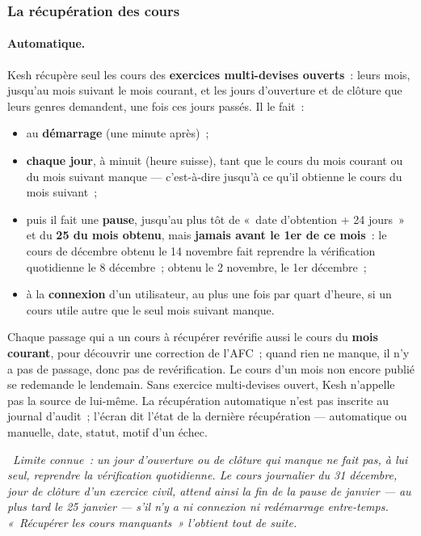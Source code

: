 \documentclass[a4paper,11pt,oneside]{article}
\begin{document}
\subsubsection{La récupération des cours}\label{sec:cours-recuperation}

\paragraph{Automatique.} Kesh récupère seul les cours des \textbf{exercices multi-devises ouverts}~: leurs mois, jusqu'au mois suivant le mois courant, et les jours d'ouverture et de clôture que leurs genres demandent, une fois ces jours passés. Il le fait~:
\begin{itemize}
    \item au \textbf{démarrage} (une minute après)~;
    \item \textbf{chaque jour}, à minuit (heure suisse), tant que le cours du mois courant ou du mois suivant manque --- c'est-à-dire jusqu'à ce qu'il obtienne le cours du mois suivant~;
    \item puis il fait une \textbf{pause}, jusqu'au plus tôt de «~date d'obtention + 24 jours~» et du \textbf{25 du mois obtenu}, mais \textbf{jamais avant le 1er de ce mois}~: le cours de décembre obtenu le 14 novembre fait reprendre la vérification quotidienne le 8 décembre~; obtenu le 2 novembre, le 1er décembre~;
    \item à la \textbf{connexion} d'un utilisateur, au plus une fois par quart d'heure, si un cours utile autre que le seul mois suivant manque.
\end{itemize}
Chaque passage qui a un cours à récupérer revérifie aussi le cours du \textbf{mois courant}, pour découvrir une correction de l'AFC~; quand rien ne manque, il n'y a pas de passage, donc pas de revérification. Le cours d'un mois non encore publié se redemande le lendemain. Sans exercice multi-devises ouvert, Kesh n'appelle pas la source de lui-même. La récupération automatique n'est pas inscrite au journal d'audit~; l'écran dit l'état de la dernière récupération --- automatique ou manuelle, date, statut, motif d'un échec.

\keshAttention\ \emph{Limite connue~: un jour d'ouverture ou de clôture qui manque ne fait pas, à lui seul, reprendre la vérification quotidienne. Le cours journalier du 31 décembre, jour de clôture d'un exercice civil, attend ainsi la fin de la pause de janvier --- au plus tard le 25 janvier --- s'il n'y a ni connexion ni redémarrage entre-temps. «~Récupérer les cours manquants~» l'obtient tout de suite.}
\end{document}
